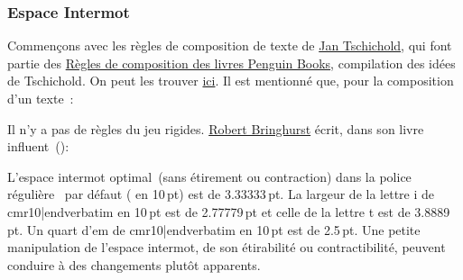 \subsubsection{Espace Intermot}
Commen\c cons avec les r\`egles de composition de texte de \href{http://www.linotype.com/794/inhonorofthe100thbirthdayofjantschichold.html}{Jan Tschichold}, qui font partie des
\href{http://openlibrary.org/books/OL19449256M/Penguin_composition_rules.}{R\`egles de composition des livres Penguin Books}, compilation des id\'ees de Tschichold. On peut les trouver \href{http://ronin-group.org/misc_etext_tschichold.html}{ici}. Il est mentionn\'e que, pour la composition d'un texte~:

\ii Il n'y a pas de r\`egles du jeu rigides. \href{http://www.typotheque.com/authors/robert_bringhurst}{Robert Bringhurst} \'ecrit, dans son livre influent~(\cite{elements_typographic}):

\ii L'espace intermot optimal~(sans \'etirement ou contraction) dans la police r\'eguli\`ere \capstex\ par d\'efaut ( en 10\,pt) est de 3.33333\,pt. La largeur de la lettre i de {\verbatim cmr10|endverbatim} en 10\,pt est de 2.77779\,pt et celle de la lettre t est de 3.8889\,pt. Un quart d'em de {\verbatim cmr10|endverbatim} en 10\,pt est de 2.5\,pt. Une petite manipulation de l'espace intermot, de son \'etirabilit\'e ou contractibilit\'e, peuvent conduire \`a des changements plut\^ot apparents.


